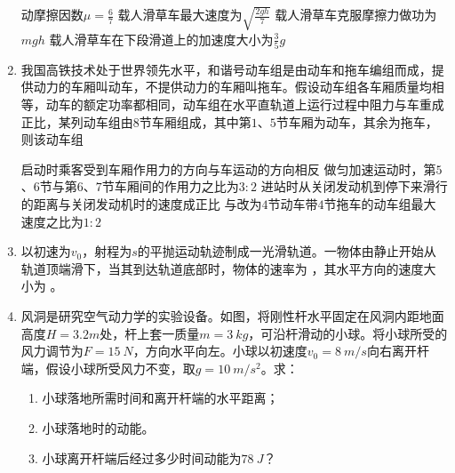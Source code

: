 \begin{enumerate}[leftmargin=0em]
\fourchoices
{动摩擦因数$ \mu= \frac{ 6 }{ 7 } $}
{载人滑草车最大速度为$\sqrt { \frac { 2 g h } { 7 } }$}
{载人滑草车克服摩擦力做功为$ mgh $}
{载人滑草车在下段滑道上的加速度大小为$\frac { 3 } { 5 } g$}




\item 
{}
我国高铁技术处于世界领先水平，和谐号动车组是由动车和拖车编组而成，提供动力的车厢叫动车，不提供动力的车厢叫拖车。假设动车组各车厢质量均相等，动车的额定功率都相同，动车组在水平直轨道上运行过程中阻力与车重成正比，某列动车组由$ 8 $节车厢组成，其中第$ 1 $、$ 5 $节车厢为动车，其余为拖车，则该动车组  


\fourchoices
{启动时乘客受到车厢作用力的方向与车运动的方向相反}
{做匀加速运动时，第$ 5 $、$ 6 $节与第$ 6 $、$ 7 $节车厢间的作用力之比为$ 3:2 $}
{进站时从关闭发动机到停下来滑行的距离与关闭发动机时的速度成正比}
{与改为$ 4 $节动车带$ 4 $节拖车的动车组最大速度之比为$ 1:2 $}





\item 
{}
以初速为$ v_{0} $，射程为$ s $的平抛运动轨迹制成一光滑轨道。一物体由静止开始从轨道顶端滑下，当其到达轨道底部时，物体的速率为  
，其水平方向的速度大小为 。



\newpage
\item
{}
风洞是研究空气动力学的实验设备。如图，将刚性杆水平固定在风洞内距地面高度$ H=3.2m $处，杆上套一质量$ m=3 \ kg $，可沿杆滑动的小球。将小球所受的风力调节为$ F=15 \ N $，方向水平向左。小球以初速度$ v_{0} =8 \ m/s $向右离开杆端，假设小球所受风力不变，取$ g=10 \ m/s^{2} $。求：
\begin{enumerate}
\renewcommand{\labelenumi}{\arabic{enumi}.}
\item
小球落地所需时间和离开杆端的水平距离；
\item 
小球落地时的动能。
\item 
小球离开杆端后经过多少时间动能为$ 78 \ J $？




\end{enumerate}
\begin{figure}[h!]
\flushright

\end{figure}



\end{enumerate}
